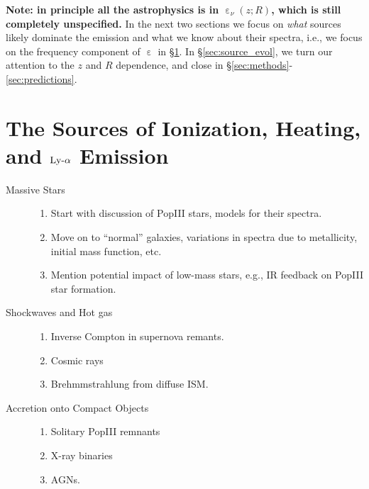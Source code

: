 \documentclass[letterpaper,titlepage,12pt]{article}
\begin{document}
{\bf Note: in principle all the astrophysics is in $\upepsilon_{\nu}(z; R)$, which is still completely unspecified.} In the next two sections we focus on \textit{what} sources likely dominate the emission and what we know about their spectra, i.e., we focus on the frequency component of $\upepsilon$ in \S\ref{sec:source_spectra}. In \S\ref{sec:source_evol}, we turn our attention to the $z$ and $R$ dependence, and close in \S\ref{sec:methods}-\ref{sec:predictions}.

\section{The Sources of Ionization, Heating, and $\text{Ly-}\alpha$ Emission} \label{sec:source_spectra}  \vspace{-12pt}

\begin{description}
  \item[Massive Stars] \hfill
  \begin{enumerate}
      \item Start with discussion of PopIII stars, models for their spectra.
      \item Move on to ``normal'' galaxies, variations in spectra due to metallicity, initial mass function, etc.
      \item Mention potential impact of low-mass stars, e.g., IR feedback on PopIII star formation. 
  \end{enumerate}

  \item[Shockwaves and Hot gas] \hfill
  \begin{enumerate}
      \item Inverse Compton in supernova remants.
      \item Cosmic rays
      \item Brehmmstrahlung from diffuse ISM.
  \end{enumerate}
  
  \item[Accretion onto Compact Objects] \hfill
  \begin{enumerate}
      \item Solitary PopIII remnants
      \item X-ray binaries
      \item AGNs.
  \end{enumerate}
  
\end{description}
\end{document}
